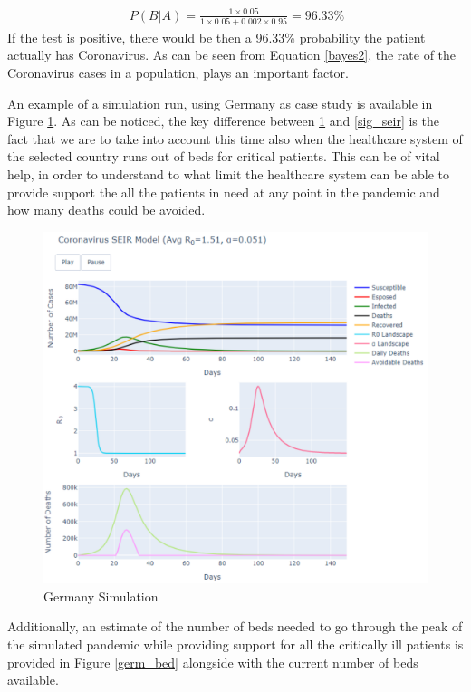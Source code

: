 \useshortskip
\begin{align}
\ P(B|A) = \frac{1 \times 0.05}{1 \times 0.05 + 0.002 \times 0.95} = 96.33\%
\end{align}
\useshortskip
If the test is positive, there would be then a 96.33\% probability the patient actually has Coronavirus. As can be seen from Equation \ref{bayes2}, the rate of the Coronavirus cases in a population, plays an important factor.

An example of a simulation run, using Germany as case study is available in Figure \ref{germ_sim}. As can be noticed, the key difference between \ref{germ_sim} and \ref{sig_seir} is the fact that we are to take into account this time also when the healthcare system of the selected country runs out of beds for critical patients. This can be of vital help, in order to understand to what limit the healthcare system can be able to provide support the all the patients in need at any point in the pandemic and how many deaths could be avoided.
\vspace{-0.3cm}
\begin{figure}[ht!]%
    \centering
    \includegraphics[width=0.85\linewidth]{latex/images/cov_g2.pdf}
    \vspace{-0.3cm}
    \caption{Germany Simulation}
    \label{germ_sim}
\end{figure}

Additionally, an estimate of the number of beds needed to go through the peak of the simulated pandemic while providing support for all the critically ill patients is provided in Figure \ref{germ_bed} alongside with the current number of beds available.

